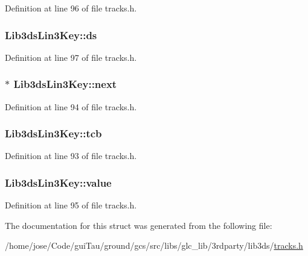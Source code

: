 Definition at line 96 of file tracks.\-h.

\hypertarget{struct_lib3ds_lin3_key_a7165fe5279ae812c30986c80d0ea8da5}{
\subsubsection[{ds}]{ Lib3ds\-Lin3\-Key\-::ds}}\label{struct_lib3ds_lin3_key_a7165fe5279ae812c30986c80d0ea8da5}


Definition at line 97 of file tracks.\-h.

\hypertarget{struct_lib3ds_lin3_key_a7bc5df3705ac8a06bfb54cdb0bb3323a}{
\subsubsection[{next}]{$\ast$ Lib3ds\-Lin3\-Key\-::next}}\label{struct_lib3ds_lin3_key_a7bc5df3705ac8a06bfb54cdb0bb3323a}


Definition at line 94 of file tracks.\-h.

\hypertarget{struct_lib3ds_lin3_key_aac1bf0863e8537712f6cc13833658958}{
\subsubsection[{tcb}]{ Lib3ds\-Lin3\-Key\-::tcb}}\label{struct_lib3ds_lin3_key_aac1bf0863e8537712f6cc13833658958}


Definition at line 93 of file tracks.\-h.

\hypertarget{struct_lib3ds_lin3_key_aaf2e5ae727d4a83363fba78e0f892de7}{
\subsubsection[{value}]{ Lib3ds\-Lin3\-Key\-::value}}\label{struct_lib3ds_lin3_key_aaf2e5ae727d4a83363fba78e0f892de7}


Definition at line 95 of file tracks.\-h.



The documentation for this struct was generated from the following file\-:\begin{DoxyCompactItemize}
\item 
/home/jose/\-Code/gui\-Tau/ground/gcs/src/libs/glc\-\_\-lib/3rdparty/lib3ds/\hyperlink{tracks_8h}{tracks.\-h}\end{DoxyCompactItemize}
